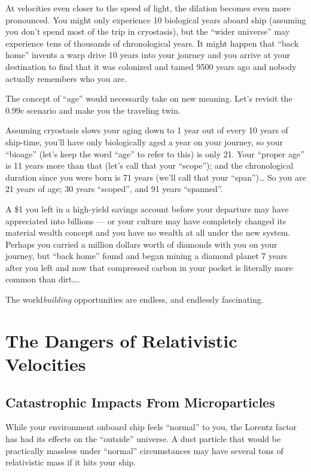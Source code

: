 \documentclass[
  letterpaper,
]{book}
\begin{document}
At velocities even closer to the speed of light, the dilation becomes
even more pronounced. You might only experience 10 biological years
aboard ship (assuming you don't spend most of the trip in cryostasis),
but the ``wider universe'' may experience tens of thousands of
chronological years. It might happen that ``back home'' invents a warp
drive 10 years into your journey and you arrive at your destination to
find that it was colonized and tamed 9500 years ago and nobody actually
remembers who you are.

The concept of ``age'' would necessarily take on new meaning. Let's
revisit the 0.99c scenario and make you the traveling twin.

Assuming cryostasis slows your aging down to 1 year out of every 10
years of ship-time, you'll have only biologically aged a year on your
journey, so your ``bioage'' (let's keep the word ``age'' to refer to
this) is only 21. Your ``proper age'' is 11 years more than that (let's
call that your ``scope''); and the chronological duration since you were
born is 71 years (we'll call that your ``span'')\ldots{} So you are 21
years of age; 30 years ``scoped'', and 91 years ``spanned''.

A \$1 you left in a high-yield savings account before your departure may
have appreciated into billions --- or your culture may have completely
changed its material wealth concept and you have no wealth at all under
the new system. Perhaps you carried a million dollars worth of diamonds
with you on your journey, but ``back home'' found and began mining a
diamond planet 7 years after you left and now that compressed carbon in
your pocket is literally more common than dirt\ldots.

The world\emph{building} opportunities are endless, and endlessly
fascinating.

\chapter{The Dangers of Relativistic
Velocities}\label{the-dangers-of-relativistic-velocities}

\section{Catastrophic Impacts From
Microparticles}\label{catastrophic-impacts-from-microparticles}

While your environment onboard ship feels ``normal'' to you, the Lorentz
factor has had its effects on the ``outside'' universe. A dust particle
that would be practically massless under ``normal'' circumstances may
have several tons of relativistic mass if it hits your ship.
\end{document}
